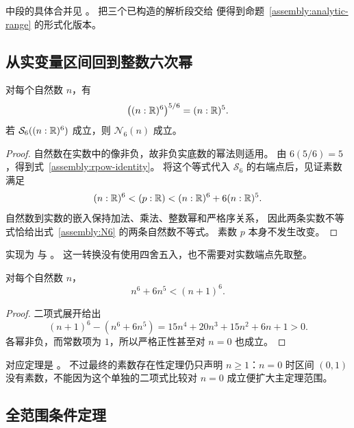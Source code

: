 中段的具体合并见
。
把三个已构造的解析段交给
便得到命题~\ref{assembly:analytic-range} 的形式化版本。

\subsection{从实变量区间回到整数六次幂}

\begin{lemma}[实数幂与自然数幂的精确转换]\label{assembly:power-conversion}
对每个自然数 $n$，有
\begin{equation}\label{assembly:rpow-identity}
 \bigl((n:\mathbb R)^6\bigr)^{5/6}=(n:\mathbb R)^5.
\end{equation}
若 $\mathcal S_6((n:\mathbb R)^6)$ 成立，则 $\mathcal N_6(n)$ 成立。
\end{lemma}

\begin{proof}
自然数在实数中的像非负，故非负实底数的幂法则适用。
由 $6(5/6)=5$，得到式~\eqref{assembly:rpow-identity}。
将这个等式代入 $\mathcal S_6$ 的右端点后，见证素数满足
\[
 (n:\mathbb R)^6<(p:\mathbb R)<(n:\mathbb R)^6+6(n:\mathbb R)^5.
\]
自然数到实数的嵌入保持加法、乘法、整数幂和严格序关系，
因此两条实数不等式恰给出式~\eqref{assembly:N6} 的两条自然数不等式。
素数 $p$ 本身不发生改变。
\end{proof}

实现为  与
。
这一转换没有使用四舍五入，也不需要对实数端点先取整。

\begin{lemma}[相邻六次幂之间的严格余量]\label{assembly:binomial-gap}
对每个自然数 $n$，
\begin{equation}\label{assembly:binomial}
 n^6+6n^5<(n+1)^6.
\end{equation}
\end{lemma}

\begin{proof}
二项式展开给出
\[
 (n+1)^6-(n^6+6n^5)
 =15n^4+20n^3+15n^2+6n+1>0.
\]
各幂非负，而常数项为 $1$，所以严格正性甚至对 $n=0$ 也成立。
\end{proof}

对应定理是 。
不过最终的素数存在性定理仍只声明 $n\geq1$：$n=0$ 时区间 $(0,1)$
没有素数，不能因为这个单独的二项式比较对 $n=0$ 成立便扩大主定理范围。

\subsection{全范围条件定理}


